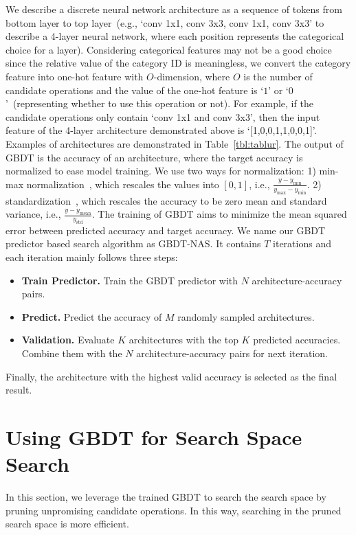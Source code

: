 \documentclass{article}
\begin{document}
We describe a discrete neural network architecture as a sequence of tokens from bottom layer to top layer~(e.g., `conv 1x1, conv 3x3, conv 1x1, conv 3x3' to describe a 4-layer neural network, where each position represents the categorical choice for a layer). Considering categorical features may not be a good choice since the relative value of the category ID is meaningless, we convert the category feature into one-hot feature with $O$-dimension, where $O$ is the number of candidate operations and the value of the one-hot feature is `$1$' or `$0$'~(representing whether to use this operation or not). For example, if the candidate operations only contain `conv 1x1 and conv 3x3', then the input feature of the 4-layer architecture demonstrated above is `[1,0,0,1,1,0,0,1]'. Examples of architectures are demonstrated in Table~\ref{tbl:tablur}. The output of GBDT is the accuracy of an architecture, where the target accuracy is normalized to ease model training. We use two ways for normalization: 1) min-max normalization~\cite{nao}, which rescales the values into $[0,1]$, i.e.,  $\frac{y-y_\text{min}}{y_\text{max}-y_\text{min}}$. 2) standardization~\cite{neuralpredictor}, which rescales the accuracy to be zero mean and standard variance, i.e., $\frac{y-y_\text{mean}}{y_\text{std}}$. The training of GBDT aims to minimize the mean squared error between predicted accuracy and target accuracy. We name our GBDT predictor based search algorithm as GBDT-NAS. It contains $T$ iterations and each iteration mainly follows three steps:
\begin{itemize}
    \item \textbf{Train Predictor.} Train the GBDT predictor with $N$ architecture-accuracy pairs.
    \item \textbf{Predict.} Predict the accuracy of $M$ randomly sampled architectures.
    \item \textbf{Validation.} Evaluate $K$ architectures with the top $K$ predicted accuracies. Combine them with the $N$ architecture-accuracy pairs for next iteration.
\end{itemize}
Finally, the architecture with the highest valid accuracy is selected as the final result.


\section{Using GBDT for Search Space Search}
In this section, we leverage the trained GBDT to search the search space by pruning unpromising candidate operations. In this way, searching in the pruned search space is more efficient.
\end{document}
